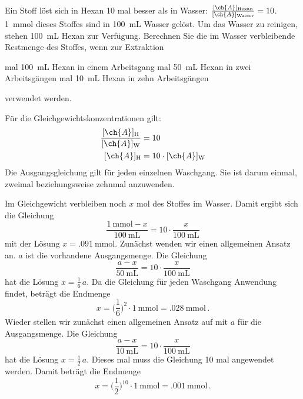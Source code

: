 \documentclass[DIV11]{scrartcl}
\begin{document}
\begin{question}[name=Verteilungsgleichgewichte]
Ein Stoff  löst sich in Hexan 10 mal besser als in Wasser:
$\frac{[\ch{A}]_\text{Hexan}}{[\ch{A}]_\text{Wasser}} = 10$. \SI{1}{\milli\mole}
dieses Stoffes sind in \SI{100}{\milli\liter} Wasser gelöst.  Um das Wasser zu
reinigen, stehen \SI{100}{\milli\liter} Hexan zur Verfügung.  Berechnen Sie
die im Wasser verbleibende Restmenge des Stoffes, wenn zur Extraktion
\begin{tasks}
   mal \SI{100}{\milli\liter} Hexan in einem Arbeitsgang
   mal \SI{50}{\milli\liter} Hexan in zwei Arbeitsgängen
   mal \SI{10}{\milli\liter} Hexan in zehn Arbeitsgängen
\end{tasks}
verwendet werden.
\end{question}
\begin{solution}
Für die Gleichgewichtskonzentrationen gilt:
\begin{align*}
  \frac{[\ch{A}]_\text{H}}{[\ch{A}]_\text{W}} &= 10 \\
  [\ch{A}]_\text{H} &= 10 \cdot [\ch{A}]_\text{W}
\end{align*}
Die Ausgangsgleichung gilt für jeden einzelnen Waschgang.  Sie ist darum einmal,
zweimal beziehungsweise zehnmal anzuwenden.

\begin{tasks}
  \task Im Gleichgewicht verbleiben noch $x$ \si{\mole} des Stoffes im
    Wasser. Damit ergibt sich die Gleichung 
    \[
      \frac{\SI{1}{\milli\mole}-x}{\SI{100}{\milli\liter}}
      = 10 \cdot \frac{x}{\SI{100}{\milli\liter}}
    \]
    mit der Lösung $x = \SI{.091}{\milli\mole}$.
  \task Zunächst wenden wir einen allgemeinen Ansatz an.  $a$ ist die
    vorhandene Ausgangsmenge.  Die Gleichung
    \[
      \frac{a-x}{\SI{50}{\milli\liter}}
      = 10 \cdot \frac{x}{\SI{100}{\milli\liter}}
    \]
    hat die Lösung $x = \frac{1}{6}\,a$.  Da die Gleichung für jeden Waschgang
    Anwendung findet, beträgt die Endmenge
    \[
      x = \biggl(\frac{1}{6}\biggr)^2\cdot\SI{1}{\milli\mole}
      = \SI{.028}{\milli\mole} \, .
    \]
  \task Wieder stellen wir zunächst einen allgemeinen Ansatz auf mit $a$ für
    die Ausgangsmenge.  Die Gleichung
    \[
      \frac{a-x}{\SI{10}{\milli\liter}}
      = 10 \cdot \frac{x}{\SI{100}{\milli\liter}}
    \]
    hat die Lösung $x = \frac{1}{2}\,a$.  Dieses mal muss die Gleichung 10 mal
    angewendet werden.  Damit beträgt die Endmenge
    \[
      x = \biggl(\frac{1}{2}\biggr)^{10}\cdot\SI{1}{\milli\mole}
        = \SI{.001}{\milli\mole} \, .
    \]
\end{tasks}
\end{solution}
\end{document}
